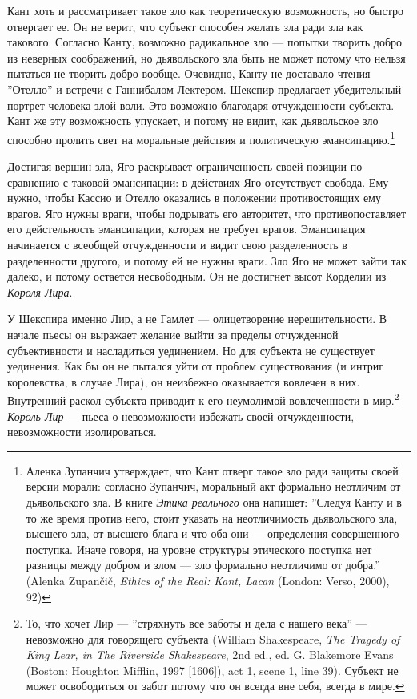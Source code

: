 \documentclass[12pt]{book}
\begin{document}
Кант хоть и рассматривает такое зло как теоретическую возможность, но быстро отвергает ее. Он не верит, что субъект способен желать зла ради зла как такового. Согласно Канту, возможно радикальное зло --- попытки творить добро из неверных соображений, но дьявольского зла быть не может потому что нельзя пытаться не творить добро вообще. Очевидно, Канту не доставало чтения ''Отелло'' и встречи с Ганнибалом Лектером. Шекспир предлагает убедительный портрет человека злой воли. Это возможно благодаря отчужденности субъекта. Кант же эту возможность упускает, и потому не видит, как дьявольское зло способно пролить свет на моральные действия и политическую эмансипацию.\footnote{Аленка Зупанчич утверждает, что Кант отверг такое зло ради защиты своей версии морали: согласно Зупанчич, моральный акт формально неотличим от дьявольского зла. В книге \textit{Этика реального} она напишет: ''Следуя Канту и в то же время против него, стоит указать на неотличимость дьявольского зла, высшего зла, от высшего блага и что оба они --- определения совершенного поступка. Иначе говоря, на уровне структуры этического поступка нет разницы между добром и злом --- зло формально неотличимо от добра.'' (Alenka Zupančič, \textit{Ethics of the Real: Kant, Lacan} (London: Verso, 2000), 92)}

Достигая вершин зла, Яго раскрывает ограниченность своей позиции по сравнению с таковой эмансипации: в действиях Яго отсутствует свобода. Ему нужно, чтобы Кассио и Отелло оказались в положении противостоящих ему врагов. Яго нужны враги, чтобы подрывать его авторитет, что противопоставляет его дейстельность эмансипации, которая не требует врагов. Эмансипация начинается с всеобщей отчужденности и видит свою разделенность в разделенности другого, и потому ей не нужны враги. Зло Яго не может зайти так далеко, и потому остается несвободным. Он не достигнет высот Корделии из \textit{Короля Лира}.

У Шекспира именно Лир, а не Гамлет --- олицетворение нерешительности. В начале пьесы он выражает желание выйти за пределы отчужденной субъективности и насладиться уединением. Но для субъекта не существует уединения. Как бы он не пытался уйти от проблем существования (и интриг королевства, в случае Лира), он неизбежно оказывается вовлечен в них. Внутренний раскол субъекта приводит к его неумолимой вовлеченности в мир.\footnote{То, что хочет Лир --- ''стряхнуть все заботы и дела с нашего века'' --- невозможно для говорящего субъекта (William Shakespeare, \textit{The Tragedy of King Lear, in The Riverside Shakespeare}, 2nd ed., ed. G. Blakemore Evans (Boston: Houghton Mifflin, 1997 [1606]), act 1, scene 1, line 39). Субъект не может освободиться от забот потому что он всегда вне себя, всегда в мире.} \textit{Король Лир} --- пьеса о невозможности избежать своей отчужденности, невозможности изолироваться.
\end{document}
